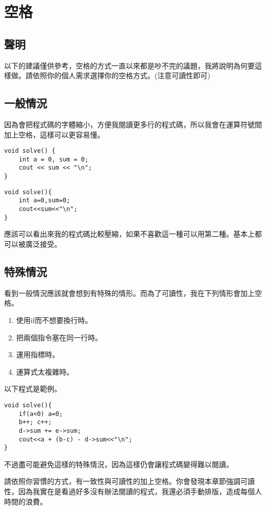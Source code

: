 \section{空格}
    \subsection{聲明}
    以下的建議僅供參考，空格的方式一直以來都是吵不完的議題，我將說明為何要這樣做。請依照你的個人需求選擇你的空格方式。(注意可讀性即可)

    \subsection{一般情況}
    因為會把程式碼的字體縮小，方便我閱讀更多行的程式碼，所以我會在運算符號間加上空格，這樣可以更容易懂。

    \begin{lstlisting}[caption=我的空格習慣(一般情況)]
void solve() {
    int a = 0, sum = 0;
    cout << sum << "\n";
}\end{lstlisting}

    \begin{lstlisting}[caption=不加上空格的版本]
void solve(){
    int a=0,sum=0;
    cout<<sum<<"\n";
}\end{lstlisting}

    應該可以看出來我的程式碼比較壓縮，如果不喜歡這一種可以用第二種。基本上都可以被廣泛接受。

    \subsection{特殊情況}
    看到一般情況應該就會想到有特殊的情形。而為了可讀性，我在下列情形會加上空格。

    \begin{enumerate}
        \item 使用if而不想要換行時。
        \item 把兩個指令塞在同一行時。
        \item 運用指標時。
        \item 運算式太複雜時。
    \end{enumerate}
    
    以下程式是範例。
    
    \begin{lstlisting}[caption=特殊情況們]
void solve(){
    if(a<0) a=0;
    b++; c++;
    d->sum += e->sum;
    cout<<a + (b-c) - d->sum<<"\n";
}\end{lstlisting}

    不過盡可能避免這樣的特殊情況，因為這樣仍會讓程式碼變得難以閱讀。

    \begin{tip}
        請依照你習慣的方式，有一致性與可讀性的加上空格。你會發現本章節強調可讀性，因為我實在是看過好多沒有辦法閱讀的程式，我還必須手動排版，造成每個人時間的浪費。
    \end{tip}